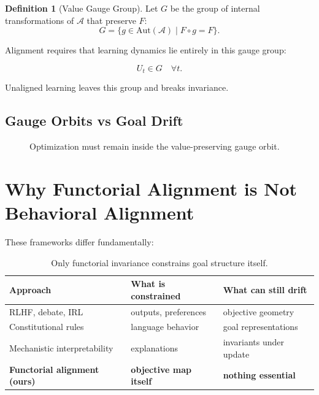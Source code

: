 \documentclass[11pt,a4paper]{article}
\theoremstyle{plain}
\theoremstyle{definition}
\newtheorem{definition}[theorem]{Definition}
\theoremstyle{remark}
\numberwithin{equation}{section}
\begin{document}
\begin{definition}[Value Gauge Group]
Let $G$ be the group of internal transformations of $\mathcal{A}$ that preserve $F$:
\[
G = \{ g \in \mathrm{Aut}(\mathcal{A}) \mid F \circ g = F \}.
\]
\end{definition}

Alignment requires that learning dynamics lie entirely in this gauge group:

\[
U_t \in G \quad \forall t.
\]

Unaligned learning leaves this group and breaks invariance.

\subsection{Gauge Orbits vs Goal Drift}

\begin{figure}[H]
\centering
{}
\caption{Optimization must remain inside the value-preserving gauge orbit.}
\end{figure}

\section{Why Functorial Alignment is Not Behavioral Alignment}

These frameworks differ fundamentally:

\begin{table}[H]
\centering
\begin{tabular}{lll}
\toprule
Approach & What is constrained & What can still drift \\
\midrule
RLHF, debate, IRL & outputs, preferences & objective geometry \\
Constitutional rules & language behavior & goal representations \\
Mechanistic interpretability & explanations & invariants under update \\
\textbf{Functorial alignment (ours)} & \textbf{objective map itself} & \textbf{nothing essential} \\
\bottomrule
\end{tabular}
\caption{Only functorial invariance constrains goal structure itself.}
\end{table}
\end{document}
